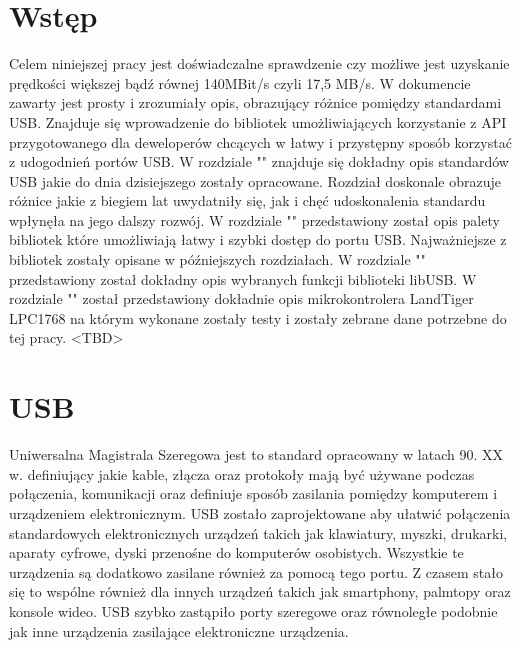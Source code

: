 \documentclass{BscUS}
\begin{document}
\chapter{Wstęp}
\label{chap1}
\pagestyle{fancy}
Celem niniejszej pracy jest doświadczalne sprawdzenie czy możliwe jest uzyskanie prędkości większej bądź równej 140MBit/s czyli 17,5 MB/s.
\newline
W dokumencie zawarty jest prosty i zrozumiały opis, obrazujący różnice pomiędzy standardami USB. Znajduje się wprowadzenie do bibliotek umożliwiających korzystanie z API przygotowanego dla deweloperów chcących w łatwy i przystępny sposób korzystać z udogodnień portów USB.
\newline
W rozdziale "" znajduje się dokładny opis standardów USB jakie do dnia dzisiejszego zostały opracowane. 
Rozdział doskonale obrazuje różnice jakie z biegiem lat uwydatniły się, jak i chęć udoskonalenia standardu wpłynęła na jego dalszy rozwój.
\newline
W rozdziale "" przedstawiony został opis palety bibliotek które umożliwiają łatwy i szybki dostęp do portu USB. Najważniejsze z bibliotek zostały opisane w późniejszych rozdziałach.
\newline
W rozdziale "" przedstawiony został dokładny opis wybranych funkcji biblioteki libUSB. 
\newline
W rozdziale "" został przedstawiony dokładnie opis mikrokontrolera LandTiger LPC1768 na którym wykonane zostały testy i zostały zebrane dane potrzebne do tej pracy.
\newline
<TBD>

\chapter{USB}
\label{USBStandardChapter}
Uniwersalna Magistrala Szeregowa jest to standard opracowany w latach 90. XX w. definiujący jakie kable, złącza oraz protokoły mają być używane podczas połączenia, komunikacji oraz definiuje sposób zasilania pomiędzy komputerem i urządzeniem elektronicznym.
\newline
USB zostało zaprojektowane aby ułatwić połączenia standardowych elektronicznych urządzeń takich jak klawiatury, myszki, drukarki, aparaty cyfrowe, dyski przenośne do komputerów osobistych. Wszystkie te urządzenia są dodatkowo zasilane również za pomocą tego portu. Z czasem stało się to wspólne również dla innych urządzeń takich jak smartphony, palmtopy oraz konsole wideo.
\newline
USB szybko zastąpiło porty szeregowe oraz równoległe podobnie jak inne urządzenia zasilające elektroniczne urządzenia.
\end{document}
